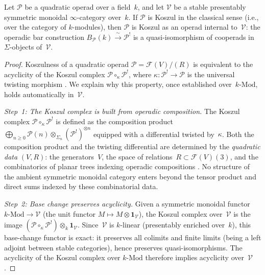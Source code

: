 \begin{lemma}
\label{lem:operadic-koszul-transfer}
Let\/ $\mathcal{P}$ be a quadratic operad over a field\/~$k$, and let\/
$\mathcal{V}$ be a stable presentably symmetric monoidal\/
$\infty$-category over\/~$k$. If\/ $\mathcal{P}$ is Koszul in the
classical sense \textup{(}i.e., over the category of\/ $k$-modules\textup{)},
then\/ $\mathcal{P}$ is Koszul as an operad internal to\/~$\mathcal{V}$:
the operadic bar construction\/
$B_{\mathcal{P}}(k) \xrightarrow{\;\sim\;} \mathcal{P}^!$
is a quasi-isomorphism of cooperads in\/ $\Sigma$-objects of\/~$\mathcal{V}$.
\end{lemma}

\begin{proof}
Koszulness of a quadratic operad $\mathcal{P} = \mathcal{F}(V)/(R)$
is equivalent to the acyclicity of the Koszul complex
$\mathcal{P} \circ_\kappa \mathcal{P}^!$, where $\kappa \colon
\mathcal{P}^! \to \mathcal{P}$ is the universal twisting morphism
\cite[Theorem~7.4.2]{LV12}. We explain why this property, once
established over~$k$\nobreakdash-$\mathrm{Mod}$, holds automatically
in~$\mathcal{V}$.

\emph{Step~1: The Koszul complex is built from operadic composition.}
The Koszul complex $\mathcal{P} \circ_\kappa \mathcal{P}^!$ is
defined as the composition product
$\bigoplus_{n \geq 0} \mathcal{P}(n) \otimes_{\Sigma_n}
(\mathcal{P}^!)^{\otimes n}$ equipped with a differential twisted
by~$\kappa$. Both the composition product and the
twisting differential are determined by the \emph{quadratic data}
$(V, R)$: the generators~$V$, the space of
relations~$R \subset \mathcal{F}(V)(3)$, and the combinatorics
of planar trees indexing operadic compositions
\cite[§7.4]{LV12}. No structure of the ambient symmetric monoidal
category enters beyond the tensor product and direct sums indexed
by these combinatorial data.

\emph{Step~2: Base change preserves acyclicity.}
Given a symmetric monoidal functor $k\text{-}\mathrm{Mod} \to
\mathcal{V}$ (the unit functor $M \mapsto M \otimes \mathbf{1}_{\mathcal{V}}$),
the Koszul complex over~$\mathcal{V}$ is the image
$(\mathcal{P} \circ_\kappa \mathcal{P}^!) \otimes_k \mathbf{1}_{\mathcal{V}}$.
Since~$\mathcal{V}$ is $k$-linear (presentably enriched over~$k$),
this base-change functor is exact: it preserves all colimits and
finite limits (being a left adjoint between stable categories),
hence preserves quasi-isomorphisms. The acyclicity of the
Koszul complex over $k$\nobreakdash-$\mathrm{Mod}$
\cite[Theorem~7.4.1]{LV12} therefore implies acyclicity
over~$\mathcal{V}$.


\end{proof}

